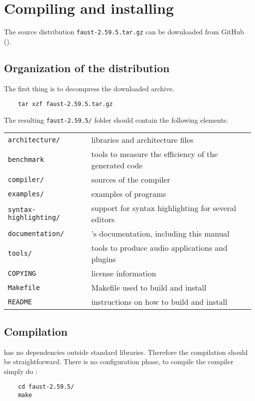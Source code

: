 \chapter{Compiling and installing \faust}
\label{install}


The \faust source distribution \lstinline'faust-2.59.5.tar.gz' can be downloaded from GitHub ().

\section{Organization of the distribution}
The first thing is to decompress the downloaded archive. 
\begin{lstlisting}
	tar xzf faust-2.59.5.tar.gz
\end{lstlisting}

The resulting \lstinline'faust-2.59.5/' folder should contain the following elements:

\begin{tabular}{ll}
	\lstinline'architecture/' 		&\faust libraries and architecture files\\
	\lstinline'benchmark'			&tools to measure the efficiency of the generated code\\
	\lstinline'compiler/'			&sources of the \faust compiler\\
	\lstinline'examples/'			&examples of \faust programs\\
	\lstinline'syntax-highlighting/'&	support for syntax highlighting for several editors\\
	\lstinline'documentation/' 		&\faust's documentation, including this manual\\
	\lstinline'tools/'				&tools to produce audio applications and plugins\\
	\lstinline'COPYING'			&license information\\
	\lstinline'Makefile'			&Makefile used to build and install \faust\\
	\lstinline'README'			&instructions on how to build and install \faust
\end{tabular}

\section{Compilation}
\faust has no dependencies outside standard libraries. Therefore the compilation should be straightforward. There is no configuration phase, to compile the \faust compiler simply do :
\begin{lstlisting}
	cd faust-2.59.5/
	make
\end{lstlisting}

